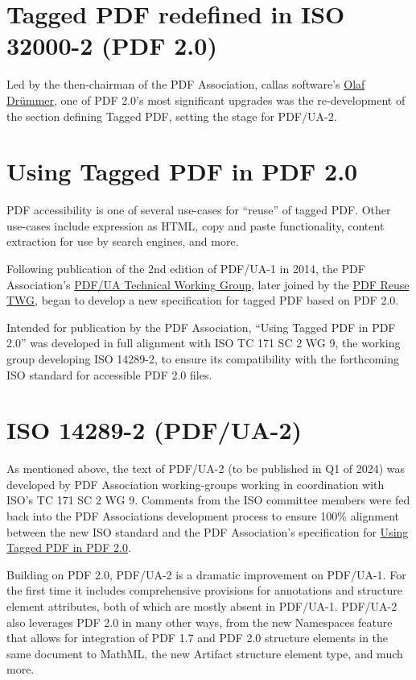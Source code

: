 \documentclass[12pt,a4paper]{article}
\begin{document}
\section{Tagged PDF redefined in ISO 32000-2 (PDF
2.0)}\label{tagged-pdf-redefined-in-iso-32000-2-pdf-2.0}

Led by the then-chairman of the PDF Association, callas software's
\href{https://pdfa.org/people/olaf-drummer/}{Olaf Drümmer}, one of PDF
2.0's most significant upgrades was the re-development of the section
defining Tagged PDF, setting the stage for PDF/UA-2.

\section{Using Tagged PDF in PDF 2.0}\label{using-tagged-pdf-in-pdf-2.0}

PDF accessibility is one of several use-cases for ``reuse'' of tagged
PDF. Other use-cases include expression as HTML, copy and paste
functionality, content extraction for use by search engines, and more.

Following publication of the 2nd edition of PDF/UA-1 in 2014, the PDF
Association's
\href{https://pdfa.org/community/pdf-ua-technical-working-group/}{PDF/UA
Technical Working Group}, later joined by the
\href{https://pdfa.org/community/pdf-reuse-twg/}{PDF Reuse TWG}, began
to develop a new specification for tagged PDF based on PDF 2.0.

Intended for publication by the PDF Association, \enquote{Using Tagged PDF in
PDF 2.0} was developed in full alignment with ISO TC 171 SC 2 WG 9, the
working group developing ISO 14289-2, to ensure its compatibility with
the forthcoming ISO standard for accessible PDF 2.0 files.

\section{ISO 14289-2 (PDF/UA-2)}\label{iso-14289-2-pdfua-2}

As mentioned above, the text of PDF/UA-2 (to be published in Q1 of 2024)
was developed by PDF Association working-groups working in coordination
with ISO's TC 171 SC 2 WG 9. Comments from the ISO committee members
were fed back into the PDF Association\textquotesingle s development
process to ensure 100\% alignment between the new ISO standard and the
PDF Association's specification for \hyperref[using-tagged-pdf-in-pdf-2.0]{Using
Tagged PDF in PDF 2.0}.

Building on PDF 2.0, PDF/UA-2 is a dramatic improvement on PDF/UA-1. For
the first time it includes comprehensive provisions for annotations and
structure element attributes, both of which are mostly absent in
PDF/UA-1. PDF/UA-2 also leverages PDF 2.0 in many other ways, from the
new Namespaces feature that allows for integration of PDF 1.7 and PDF
2.0 structure elements in the same document to MathML, the new Artifact
structure element type, and much more.
\end{document}
